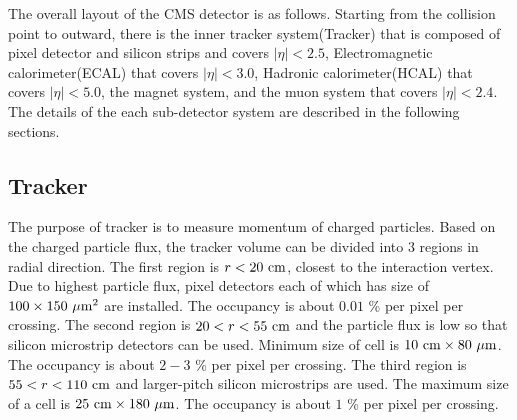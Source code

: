The overall layout of the CMS detector is as follows. 
Starting from the collision point to outward, there is the inner tracker system(Tracker) 
that is composed of pixel detector and silicon strips and covers $|\eta|<2.5$, 
Electromagnetic calorimeter(ECAL) that covers  $|\eta|<3.0$, 
Hadronic calorimeter(HCAL) that covers  $|\eta|<5.0$, the magnet system, 
and the muon system that covers  $|\eta|<2.4$. 
The details of the each sub-detector system are described in the following sections. 





\subsection{Tracker}

The purpose of tracker is to measure momentum of charged particles. 
Based on the charged particle flux, the tracker volume can be divided 
into 3 regions in radial direction. The first region is $r<20~\mathrm{cm}$, closest 
to the interaction vertex. Due to highest particle flux, pixel detectors 
each of which has size of $100 \times 150~\mu\mathrm{m}^2$ are installed. 
The occupancy is about $0.01$ \% per pixel per crossing. 
The second region is $20<r<55~\mathrm{cm}$ and the particle flux is low so that silicon 
microstrip detectors can be used. Minimum size of cell is $10~\mathrm{cm} \times 80~\mu\mathrm{m}$.
The occupancy is about $2-3$ \% per pixel per crossing. 
The third region is $55<r<110~\mathrm{cm}$ and larger-pitch silicon microstrips
are used. The maximum size of a cell is $25~\mathrm{cm} \times 180~\mu\mathrm{m}$.
The occupancy is about $1$ \% per pixel per crossing. 

